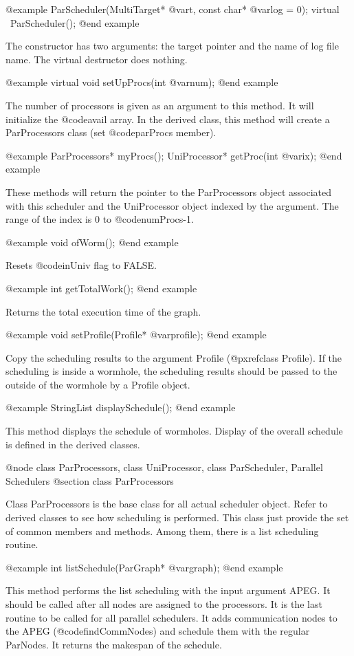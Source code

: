 @example
ParScheduler(MultiTarget* @var{t}, const char* @var{log} = 0);
virtual ~ParScheduler();
@end example

The constructor has two arguments: the target pointer and the name of log
file name. The virtual destructor does nothing.

@example
virtual void setUpProcs(int @var{num});
@end example

The number of processors is given as an argument to this method. It
will initialize the @code{avail} array. In the derived class, this
method will create a ParProcessors class (set @code{parProcs} member).

@example
ParProcessors* myProcs();
UniProcessor* getProc(int @var{ix});
@end example

These methods will return the pointer to the ParProcessors object associated
with this scheduler and the UniProcessor object indexed by the argument.
The range of the index is 0 to @code{numProcs}-1.

@example
void ofWorm();
@end example

Resets @code{inUniv} flag to FALSE.

@example
int getTotalWork();
@end example

Returns the total execution time of the graph.

@example
void setProfile(Profile* @var{profile});
@end example

Copy the scheduling results to the argument Profile (@pxref{class Profile}).
If the scheduling is inside a wormhole, the scheduling results should be
passed to the outside of the wormhole by a Profile object.

@example
StringList displaySchedule();
@end example

This method displays the schedule of wormholes. Display of the
overall schedule is defined in the derived classes.

@node class ParProcessors, class UniProcessor, class ParScheduler, Parallel Schedulers
@section class ParProcessors

Class ParProcessors is the base class for all actual scheduler object.
Refer to derived classes to see how scheduling is performed. This class
just provide the set of common members and methods. Among them, there is
a list scheduling routine.

@example
int listSchedule(ParGraph* @var{graph});
@end example

This method performs the list scheduling with the input argument APEG.
It should be called after all nodes are assigned to the processors. It
is the last routine to be called for all parallel schedulers. It adds
communication nodes to the APEG (@code{findCommNodes}) and schedule 
them with the regular ParNodes. It returns the makespan of the schedule.

